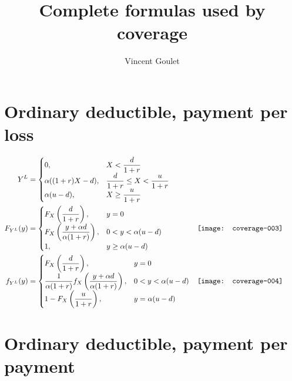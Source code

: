 \documentclass{article}
\title{Complete formulas used by coverage}
\author{Vincent Goulet}
\newcommand{\D}{\displaystyle}
\begin{document}
\maketitle


\section{Ordinary deductible, payment per loss}


\begin{align*}
  Y^L
  &=
  \begin{cases}
    0,
      & X < \D \frac{d}{1 + r} \\
    \alpha ((1 + r) X - d),
      & \D\frac{d}{1 + r} \leq X < \frac{u}{1 + r} \\
    \alpha (u - d),
      & \D X \geq \frac{u}{1 + r}
  \end{cases} & \\
  F_{Y^L}(y)
  &=
  \begin{cases}
    F_X \left( \D\frac{d}{1 + r} \right),
      & y = 0 \\
    F_X \left( \D\frac{y + \alpha d}{\alpha(1 + r)} \right),
      & 0 < y < \alpha (u - d) \\
    1,
      & y \geq \alpha(u - d)
  \end{cases} &
  \begin{minipage}{0.4\linewidth}
\texttt{[image: coverage-003]}
  \end{minipage} \\
  f_{Y^L}(y)
  &=
  \begin{cases}
    F_X \left( \D\frac{d}{1 + r} \right),
      & y = 0 \\
    \D\frac{1}{\alpha (1 + r)} f_X \left( \D\frac{y + \alpha
        d}{\alpha(1 + r)} \right),
      & 0 < y < \alpha (u - d) \\
    1 - F_X \left( \D\frac{u}{1 + r} \right),
      & y = \alpha(u - d)
  \end{cases} &
  \begin{minipage}{0.4\linewidth}
\texttt{[image: coverage-004]}
  \end{minipage}
\end{align*}


\section{Ordinary deductible, payment per payment}
\end{document}
